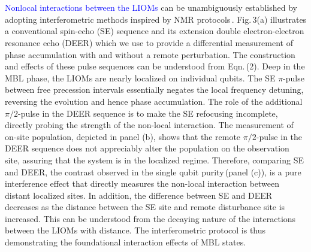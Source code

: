 \section{} %
\vspace{-16mm}

\textcolor{blue}{Nonlocal interactions between the LIOMs} can be unambiguously established by adopting interferometric methods inspired by NMR protocols\,\cite{KnapPRL2014}.  Fig.\,3(a) illustrates a conventional spin-echo (SE) sequence and its extension double electron-electron resonance echo (DEER) which we use to provide a differential measurement of phase accumulation with and without a remote perturbation. The construction and effects of these pulse sequences can be understood from Eqn.\,(2). Deep in the MBL phase, the LIOMs are nearly localized on individual qubits. The SE $\pi$-pulse between free precession intervals essentially negates the local frequency detuning, reversing the evolution and hence phase accumulation. The role of the additional $\pi/2$-pulse in the DEER sequence is to make the SE refocusing incomplete, directly probing the strength of the non-local interaction. The measurement of on-site population, depicted in panel (b), shows that the remote $\pi / 2$-pulse in the DEER sequence does not appreciably alter the population on the observation site, assuring that the system is in the localized regime. Therefore, comparing SE and DEER, the contrast observed in the single qubit purity\,(panel (c)), is a pure interference effect that directly measures the non-local interaction between distant localized sites. In addition, the difference between SE and DEER decreases as the distance between the SE site and remote disturbance site is increased. This can be understood from the decaying nature of the interactions between the LIOMs with distance. The interferometric protocol is thus demonstrating the foundational interaction effects of MBL states.


